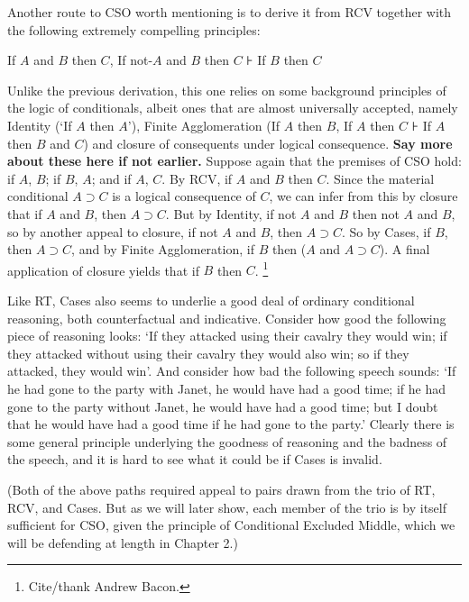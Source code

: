 \documentclass[If.tex]{subfiles}
\begin{document}
\begin{prop}
Another route to CSO worth mentioning is to derive it from RCV together with the following extremely compelling principles:
\begin{prop}
	\litem[Cases]
	If $A$ and $B$ then $C$, If not-$A$ and $B$ then $C$ ⊦ If $B$ then $C$
\end{prop}
Unlike the previous derivation, this one relies on some background principles of the logic of conditionals, albeit ones that are almost universally accepted, namely Identity (‘If $A$ then $A$’), Finite Agglomeration (If $A$ then $B$, If $A$ then $C$ ⊦ If $A$ then $B$ and $C$) and closure of consequents under logical consequence. \textbf{Say more about these here if not earlier.} Suppose again that the premises of CSO hold: if $A$, $B$; if $B$, $A$; and if $A$, $C$. By RCV, if $A$ and $B$ then $C$. Since the material conditional $A⊃C$ is a logical consequence of $C$, we can infer from this by closure that if $A$ and $B$, then $A⊃C$. But by Identity, if not $A$ and $B$ then not $A$ and $B$, so by another appeal to closure, if not $A$ and $B$, then $A⊃C$. So by Cases, if $B$, then $A⊃C$, and by Finite Agglomeration, if $B$ then ($A$ and $A⊃C$). A final application of closure yields that if $B$ then $C$.%
\footnote{Cite/thank Andrew Bacon.}


Like RT, Cases also seems to underlie a good deal of ordinary conditional reasoning, both counterfactual and indicative. Consider how good the following piece of reasoning looks: ‘If they attacked using their cavalry they would win; if they attacked without using their cavalry they would also win; so if they attacked, they would win’. And consider how bad the following speech sounds: ‘If he had gone to the party with Janet, he would have had a good time; if he had gone to the party without Janet, he would have had a good time; but I doubt that he would have had a good time if he had gone to the party.’ Clearly there is some general principle underlying the goodness of reasoning and the badness of the speech, and it is hard to see what it could be if Cases is invalid.

(Both of the above paths required appeal to pairs drawn from the trio of RT, RCV, and Cases. But as we will later show, each member of the trio is by itself sufficient for CSO, given the principle of Conditional Excluded Middle, which we will be defending at length in Chapter 2.)


\end{prop}
\end{document}
